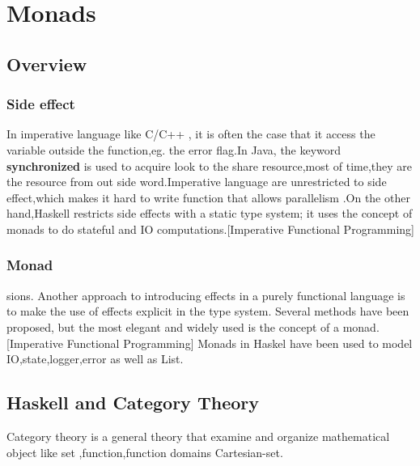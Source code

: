 \chapter{Monads}
\section{Overview}
\subsection{Side effect}
In imperative language like C/C++ , it is often the case that it access the variable outside the function,eg. the error flag.In Java, the keyword \textbf{synchronized} is used to acquire look to the share resource,most of time,they are the resource from out side word.Imperative language are unrestricted to side effect,which makes it hard to write function that allows parallelism .On the other hand,Haskell restricts side effects with a static type system; it uses the concept of monads to do stateful and IO computations.[Imperative Functional Programming]

\subsection{Monad}
sions.
Another approach to introducing effects in a purely functional language
is to make the use of effects explicit in the type system. Several methods
have been proposed, but the most elegant and widely used is the concept
of a monad.[Imperative Functional Programming]  Monads in Haskel have been used to model IO,state,logger,error as well as List.




\section{Haskell and Category Theory}
Category theory is a general theory that examine and organize mathematical object like set ,function,function domains Cartesian-set.

